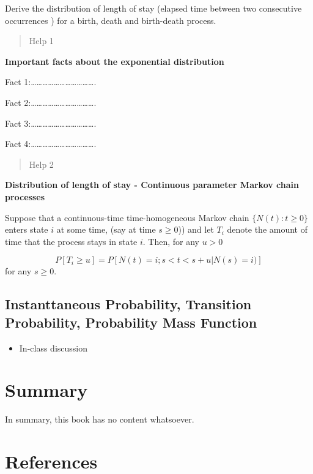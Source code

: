 \documentclass[
  letterpaper,
  DIV=11,
  numbers=noendperiod]{scrreprt}
\providecommand{\tightlist}{%
  \setlength{\itemsep}{0pt}\setlength{\parskip}{0pt}}\usepackage{longtable,booktabs,array}
\newlength{\cslhangindent}
\newenvironment{CSLReferences}[2] %
 {\begin{list}{}{%
  \setlength{\itemindent}{0pt}
  \setlength{\leftmargin}{0pt}
  \setlength{\parsep}{0pt}
  \ifodd #1
   \setlength{\leftmargin}{\cslhangindent}
   \setlength{\itemindent}{-1\cslhangindent}
  \fi
  \setlength{\itemsep}{#2\baselineskip}}}
 {\end{list}}
\begin{document}
Derive the distribution of length of stay (elapsed time between two
consecutive occurrences ) for a birth, death and birth-death process.

\begin{quote}
Help 1
\end{quote}

\textbf{Important facts about the exponential distribution}

Fact
1:\ldots\ldots\ldots\ldots\ldots\ldots\ldots\ldots\ldots\ldots\ldots.

Fact
2:\ldots\ldots\ldots\ldots\ldots\ldots\ldots\ldots\ldots\ldots\ldots.

Fact
3:\ldots\ldots\ldots\ldots\ldots\ldots\ldots\ldots\ldots\ldots\ldots.

Fact
4:\ldots\ldots\ldots\ldots\ldots\ldots\ldots\ldots\ldots\ldots\ldots.

\begin{quote}
Help 2
\end{quote}

\textbf{Distribution of length of stay - Continuous parameter Markov
chain processes}

Suppose that a continuous-time time-homogeneous Markov chain
\(\{N(t): t \geq 0\}\) enters state \(i\) at some time, (say at time
\(s \geq 0\))) and let \(T_i\) denote the amount of time that the
process stays in state \(i\). Then, for any \(u > 0\)

\[P[T_i \geq u] = P[N(t)=i; s < t < s+u|N(s)=i)]\] for any \(s \geq 0\).

\section{Instanttaneous Probability, Transition Probability, Probability
Mass
Function}\label{instanttaneous-probability-transition-probability-probability-mass-function}

\begin{itemize}
\tightlist
\item
  In-class discussion
\end{itemize}


\chapter{Summary}\label{summary}

In summary, this book has no content whatsoever.


\chapter*{References}\label{references}


\label{refs}
\begin{CSLReferences}{0}{1}
\end{CSLReferences}
\end{document}
